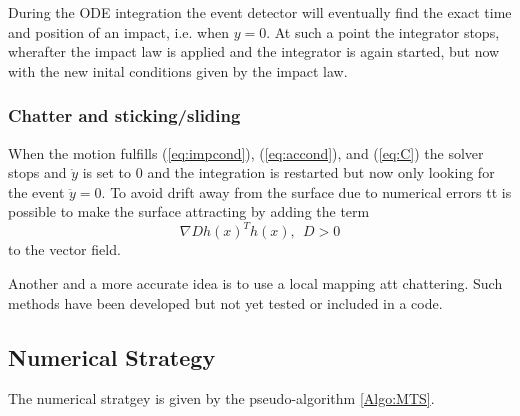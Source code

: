 \documentclass[10pt]{article}
\begin{document}
During the ODE integration the event detector will eventually find the exact time and position of an impact, i.e. when $y=0$. At such a point the integrator stops, wherafter the impact law is applied and the integrator is again started, but now with the new inital conditions given by the impact law.

\subsubsection*{Chatter and sticking/sliding}
When the motion fulfills (\ref{eq:impcond}), (\ref{eq:accond}), and (\ref{eq:C}) the solver stops and $\dot{y}$ is set to $0$ and the integration is restarted but now only looking for the event $\ddot{y} = 0$. To avoid drift away from the surface due to numerical errors tt is possible to make the surface attracting by adding the term
\begin{equation}
\nabla Dh(x)^Th(x), \ \ D > 0
\end{equation}  
to the vector field.

Another and a more accurate idea is to use a local mapping att chattering. Such methods have been developed but not yet tested or included in a code.  


\subsection{Numerical Strategy}

The numerical stratgey is given by the pseudo-algorithm \ref{Algo:MTS}.
\end{document}
